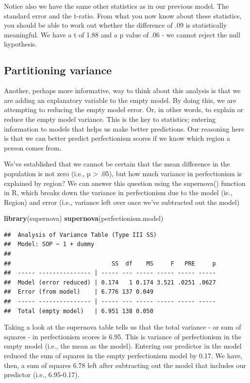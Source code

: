 \documentclass[
]{article}
\newenvironment{Shaded}{\begin{snugshade}}{\end{snugshade}}
\newcommand{\FunctionTok}[1]{\textcolor[rgb]{0.13,0.29,0.53}{\textbf{#1}}}
\newcommand{\NormalTok}[1]{#1}
\begin{document}
Notice also we have the same other statistics as in our previous model.
The standard error and the t-ratio. From what you now know about these
statistics, you should be able to work out whether the difference of .09
is statistically meaningful. We have a t of 1.88 and a p value of .06 -
we cannot reject the null hypothesis.

\subsection{Partitioning variance}\label{partitioning-variance}

Another, perhaps more informative, way to think about this analysis is
that we are adding an explanatory variable to the empty model. By doing
this, we are attempting to reducing the empty model error. Or, in other
words, to explain or reduce the empty model variance. This is the key to
statistics; entering information to models that helps us make better
predictions. Our reasoning here is that we can better predict
perfectionism scores if we know which region a person comes from.

We've established that we cannot be certain that the mean difference in
the population is not zero (i.e., p \textgreater{} .05), but how much
variance in perfectionism is explained by region? We can answer this
question using the supernova() function in R, which breaks down the
variance in perfectionism due to the model (ie., Region) and error
(i.e., variance left over once we've subtracted out the model)

\begin{Shaded}
\begin{Highlighting}[]
\FunctionTok{library}\NormalTok{(supernova)}
\FunctionTok{supernova}\NormalTok{(perfectionism.model)}
\end{Highlighting}
\end{Shaded}

\begin{verbatim}
##  Analysis of Variance Table (Type III SS)
##  Model: SOP ~ 1 + dummy
## 
##                             SS  df    MS     F   PRE     p
##  ----- --------------- | ----- --- ----- ----- ----- -----
##  Model (error reduced) | 0.174   1 0.174 3.521 .0251 .0627
##  Error (from model)    | 6.776 137 0.049                  
##  ----- --------------- | ----- --- ----- ----- ----- -----
##  Total (empty model)   | 6.951 138 0.050
\end{verbatim}

Taking a look at the supernova table tells us that the total variance -
or sum of squares - in perfectionism scores is 6.95. This is variance of
perfectionism in the empty model (i.e., the mean as the model). Entering
our predictor in the model reduced the sum of squares in the empty
perfectionism model by 0.17. We have, then, a sum of squares 6.78 left
after subtracting out the model that includes our predictor (i.e.,
6.95-0.17).
\end{document}
